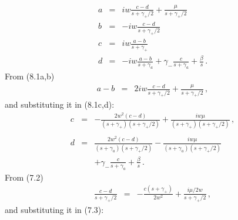 \documentclass[twocolumn,aps,eqsecnum,showkeys,amsmath]{revtex4-2}
\begin{document}
%
\begin{subequations}
\begin{eqnarray} 	
a &=& i w\frac{c -d}{s +\gamma_+/2}  +\frac{\mu}{s +\gamma_+/2}  \\ 
b &=& -i w\frac{c -d}{s +\gamma_+/2}  	\\ 
c &=& i w \frac{a-b}{s +\gamma_+}   		\\ 
d &=& -i w \frac{a-b}{s +\gamma_a} +\gamma_- \frac{c}{s+ \gamma_a}  
	+ \frac{\beta}{s} \,.
\end{eqnarray} 
\end{subequations}
From (8.1a,b) 
%
\begin{eqnarray*} 	
a-b &=& 
	2 i w\frac{c -d}{s +\gamma_+/2}  +\frac{\mu}{s +\gamma_+/2} \,,
\end{eqnarray*} 
and substituting it in (8.1c,d):
%
\begin{eqnarray} 	
c &=& - \frac{2w^2 (c-d)}{ (s+\gamma_+) (s +\gamma_+/2) }   
	+\frac{i w \mu}{ (s+\gamma_+) (s +\gamma_+/2) } 	\,, 	
	\nonumber \\ \\
d &=& \frac{2w^2 (c-d)}{(s +\gamma_a)(s +\gamma_+/2)} 
	-\frac{i w \mu}{ (s+\gamma_a) (s +\gamma_+/2) } 	\nonumber \\
	&&+\gamma_- \frac{c}{s+ \gamma_a}  + \frac{\beta}{s} \,.
\end{eqnarray} 
From (7.2) 
%
\begin{eqnarray} 	
\frac{c-d}{ s +\gamma_+/2 } &=& -\frac{c(s+\gamma_+)}{2w^2}  
	+\frac{i \mu/2w}{s +\gamma_+/2} 	\,,  	
\end{eqnarray} 
and substituting it in (7.3): 
\end{document}
